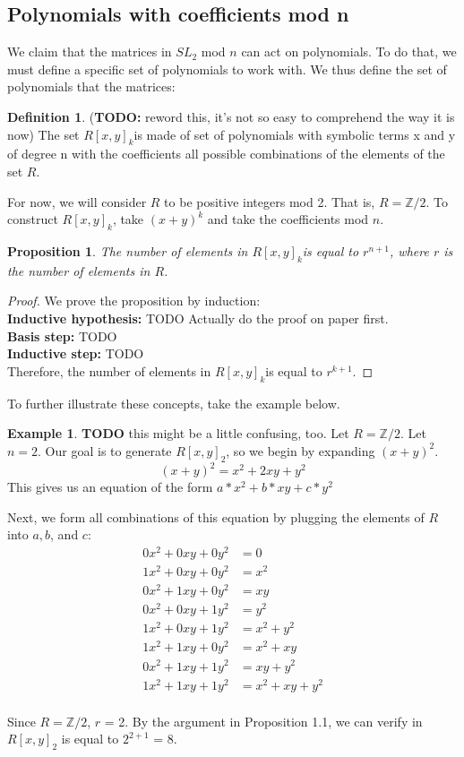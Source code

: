 \documentclass[a4paper,draft]{amsproc}
\theoremstyle{plain}
\newtheorem{prop}{Proposition}[section]
\theoremstyle{definition}
\newtheorem{exm}{Example}[section]
\newtheorem{dfn}{Definition}[section]
\theoremstyle{remark}
\numberwithin{equation}{section}
\begin{document}
\subsection{Polynomials with coefficients mod n}
We claim that the matrices in $SL_{2}$ mod $n$ can act on polynomials. To do that, we must define a specific set of polynomials to work with. 
We thus define the set of polynomials that the matrices: 
\begin{dfn}
(\textbf{TODO:} reword this, it's not so easy to comprehend the way it is now) The set $R[x,y]_{k}$is made of set of polynomials with symbolic terms x and y of degree n with the coefficients all possible combinations of the elements of the set $R$. 
\end{dfn}
For now, we will consider $R$ to be positive integers mod 2. That is, $R = \mathbb{Z}/2$. To construct $R[x,y]_{k}$, take $(x+y)^{k}$ and take the coefficients mod $n$.

\begin{prop}The number of elements in $R[x,y]_{k}$is equal to $r^{n + 1}$, where $r$ is the number of elements in $R$. 
\end{prop}

\begin{proof}
We prove the proposition by induction: \\
\textbf{Inductive hypothesis: } TODO Actually do the proof on paper first. \\
\textbf{Basis step: } TODO \\
\textbf{Inductive step:} TODO \\

Therefore, the number of elements in $R[x,y]_{k}$is equal to $r^{k + 1}$. 
\end{proof}
To further illustrate these concepts, take the example below. 
\begin{exm}
\textbf{TODO} this might be a little confusing, too. 
Let $R = \mathbb{Z}/2$.  Let $n = 2$. Our goal is to generate $R[x,y]_{2}$, so we begin by expanding $(x + y)^{2}$. 
$$(x + y)^{2} = x^{2} + 2xy + y^{2} $$
This gives us an equation of the form $a*x^{2} + b*xy + c*y^{2} $

Next, we form all combinations of this equation by plugging the elements of $R$ into $a, b$, and $c$: 
\begin{align*}
0x^{2} + 0xy + 0y^{2} &= 0 \\
1x^{2} + 0xy + 0y^{2} &= x^{2} \\
0x^{2} +1xy + 0y^{2}  &= xy \\
0x^{2} + 0xy + 1y^{2} &= y^{2} \\
1x^{2} + 0xy + 1y^{2} &= x^{2} + y^{2} \\
1x^{2} + 1xy + 0y^{2} &= x^{2} + xy \\
0x^{2} + 1xy + 1y^{2} &= xy + y^{2} \\
1x^{2} + 1xy + 1y^{2}  &= x^{2} + xy + y^{2}\\
\end{align*}

Since  $R = \mathbb{Z}/2$, $r$ = 2. By the argument in Proposition 1.1, we can verify  in $R[x,y]_{2}$ is equal to $2^{2 + 1}$ = 8.
\end{exm}
\end{document}
